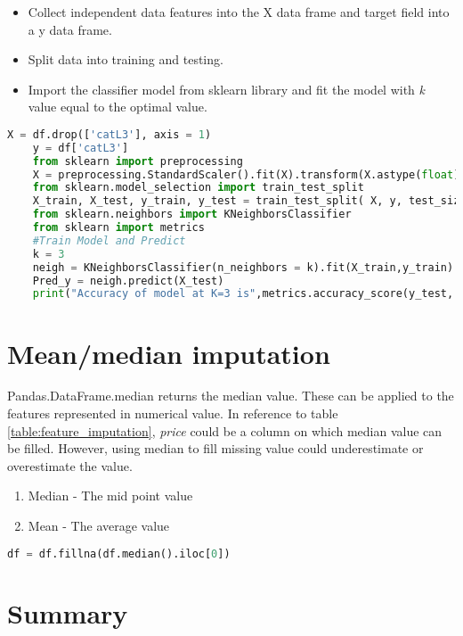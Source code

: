 \begin{itemize}
    \item Collect independent data features into the X data frame and target field into a y data frame.
    \item  Split data into training and testing. 
    \item  Import the classifier model from sklearn library and fit the model with  \textit{k} value equal to the optimal value.
\end{itemize}

\begin{lstlisting}[language=Python]
    X = df.drop(['catL3'], axis = 1)
    y = df['catL3']
    from sklearn import preprocessing
    X = preprocessing.StandardScaler().fit(X).transform(X.astype(float))
    from sklearn.model_selection import train_test_split
    X_train, X_test, y_train, y_test = train_test_split( X, y, test_size=0.2, random_state=4)
    from sklearn.neighbors import KNeighborsClassifier
    from sklearn import metrics
    #Train Model and Predict
    k = 3  
    neigh = KNeighborsClassifier(n_neighbors = k).fit(X_train,y_train)
    Pred_y = neigh.predict(X_test)
    print("Accuracy of model at K=3 is",metrics.accuracy_score(y_test, Pred_y))
\end{lstlisting}



\section{Mean/median imputation}

Pandas.DataFrame.median \parencite{mckinney-proc-scipy-2010} returns the median value. These can be applied to the features represented in numerical value. In reference to table \ref{table:feature_imputation}, \textit{price} could be a column on which median value can be filled. However, using median to fill missing value could underestimate or overestimate the value.

\begin{enumerate}
    \item Median - The mid point value
    \item Mean - The average value
\end{enumerate}

\begin{lstlisting}[language=Python]
    df = df.fillna(df.median().iloc[0])
\end{lstlisting}

\section{Summary}

